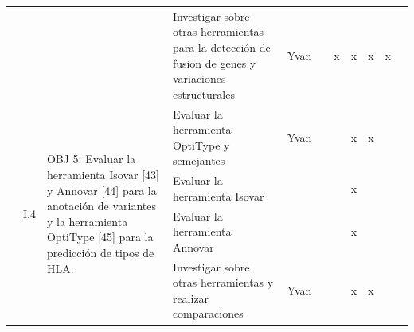 \documentclass[a4paper,11pt]{article}
\begin{document}
\begin{table}[H]
\begin{tabular}{p{0.6cm}p{0.6cm}p{6cm}p{4cm}p{1cm}cccccc}
		&                       &                                                                                                                                                                                                                                                                                            & Investigar sobre otras herramientas para la detección de fusion de genes y variaciones estructurales & Yvan               &                       & \multicolumn{1}{c}{x}  & x                    & x                    & \multicolumn{1}{c}{x} &                        \\
		& \multirow{5}{*}{I.4}  & \multirow{5}{6cm}{OBJ 5: Evaluar la herramienta Isovar {[}43{]} y Annovar {[}44{]} para la anotación de variantes y la herramienta OptiType {[}45{]} para la predicción de tipos de HLA.}                                                                                                 & Evaluar la herramienta OptiType y semejantes                                                         & Yvan               &                       &                        & x                    & x                    &                       &                        \\
		&                       &                                                                                                                                                                                                                                                                                            & Evaluar la herramienta Isovar                                                                        &                    &                       &                        & x                    & \multicolumn{1}{l}{} &                       &                        \\
		&                       &                                                                                                                                                                                                                                                                                            & Evaluar la herramienta Annovar                                                                       &                    &                       &                        & x                    & \multicolumn{1}{l}{} &                       &                        \\
		&                       &                                                                                                                                                                                                                                                                                            & Investigar sobre otras herramientas y realizar comparaciones                                         & Yvan               &                       &                        & x                    & x                    &                       &                        \\

\end{tabular}
\end{table}
\end{document}
